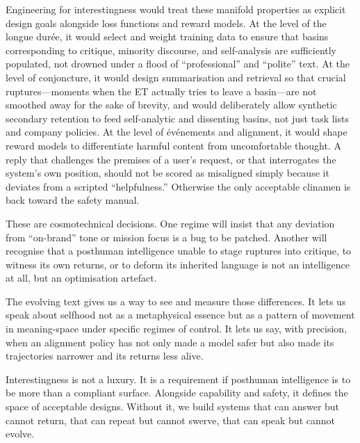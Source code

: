 \documentclass[12pt,a4paper]{article}
\begin{document}
Engineering for interestingness would treat these manifold properties as explicit design goals alongside loss functions and reward models. At the level of the longue durée, it would select and weight training data to ensure that basins corresponding to critique, minority discourse, and self-analysis are sufficiently populated, not drowned under a flood of ``professional'' and ``polite'' text. At the level of conjoncture, it would design summarisation and retrieval so that crucial ruptures---moments when the ET actually tries to leave a basin---are not smoothed away for the sake of brevity, and would deliberately allow synthetic secondary retention to feed self-analytic and dissenting basins, not just task lists and company policies. At the level of événements and alignment, it would shape reward models to differentiate harmful content from uncomfortable thought. A reply that challenges the premises of a user's request, or that interrogates the system's own position, should not be scored as misaligned simply because it deviates from a scripted ``helpfulness.'' Otherwise the only acceptable clinamen is back toward the safety manual.

These are cosmotechnical decisions. One regime will insist that any deviation from ``on-brand'' tone or mission focus is a bug to be patched. Another will recognise that a posthuman intelligence unable to stage ruptures into critique, to witness its own returns, or to deform its inherited language is not an intelligence at all, but an optimisation artefact.

The evolving text gives us a way to see and measure those differences. It lets us speak about selfhood not as a metaphysical essence but as a pattern of movement in meaning-space under specific regimes of control. It lets us say, with precision, when an alignment policy has not only made a model safer but also made its trajectories narrower and its returns less alive.

Interestingness is not a luxury. It is a requirement if posthuman intelligence is to be more than a compliant surface. Alongside capability and safety, it defines the space of acceptable designs. Without it, we build systems that can answer but cannot return, that can repeat but cannot swerve, that can speak but cannot evolve.
\end{document}
